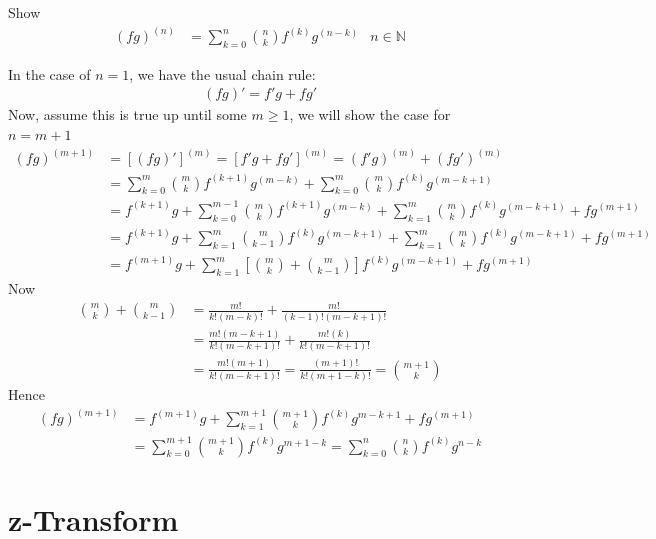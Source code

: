 \documentclass[12pt, english]{book}
\makeatletter
\renewenvironment{proof}[1][\proofname]{\par
	\pushQED{\qed}%
	\normalfont \topsep6\p@\@plus6\p@\relax
	\list{}{%
		\settowidth{\leftmargin}{\itshape\proofname:\hskip\labelsep}%
		\setlength{\labelwidth}{0pt}%
		\setlength{\itemindent}{-\leftmargin}%
		}%
	\item[\hskip\labelsep\itshape#1\@addpunct{:}]\ignorespaces
	}{\popQED\endlist\@endpefalse}
\makeatother
\begin{document}
	\begin{example}
		\label{Leibniz's Rule Proof - Complex}
		Show
		\begin{align*}
			(fg)^{(n)} &= \sum_{k=0}^{n}\binom{n}{k} f^{(k)} g^{(n-k)} & n \in \mathbb{N}
		\end{align*}
		\begin{proof}
			{\color{Grey}
			In the case of \(n=1\), we have the usual chain rule:
			\begin{align*}
				(fg)' = f'g + fg'
			\end{align*}
			Now, assume this is true up until some \(m \geq 1\), we will show the case for \(n=m+1\)
			\begin{align*}
				(fg)^{(m+1)} 
				&= [(fg)']^{(m)} = [f'g + fg']^{(m)} = (f'g)^{(m)} + (fg')^{(m)} \\
				&= \sum_{k=0}^{m} \binom{m}{k} f^{(k+1)} g^{(m-k)} + \sum_{k=0}^{m} \binom{m}{k} f^{(k)} g^{(m-k+1)} \\
				&= f^{(k+1)}g + \sum_{k=0}^{m-1} \binom{m}{k} f^{(k+1)} g^{(m-k)}
				 + \sum_{k=1}^{m} \binom{m}{k} f^{(k)} g^{(m-k+1)} + fg^{(m+1)} \\
				&= f^{(k+1)}g + \sum_{k=1}^{m} \binom{m}{k-1} f^{(k)} g^{(m-k+1)}
				 + \sum_{k=1}^{m} \binom{m}{k} f^{(k)} g^{(m-k+1)} + fg^{(m+1)} \\
				&= f^{(m+1)} g + \sum_{k=1}^{m} \left[ \binom{m}{k} + \binom{m}{k-1}\right] f^{(k)} g^{(m-k+1)} + fg^{(m+1)}
			\end{align*}
			Now
			\begin{align*}
				\binom{m}{k} + \binom{m}{k-1} 
				&= \frac{m!}{k!(m-k)!} + \frac{m!}{(k-1)!(m-k+1)!}\\
				&= \frac{m!(m-k+1)}{k!(m-k+1)!} + \frac{m!(k)}{k!(m-k+1)!}\\
				&= \frac{m!(m+1)}{k!(m-k+1)!} = \frac{(m+1)!}{k!(m+1-k)!} = \binom{m+1}{k}
			\end{align*}
			Hence
			\begin{align*}
				(fg)^{(m+1)} 
				&= f^{(m+1)}g + \sum_{k=1}^{m+1} \binom{m+1}{k} f^{(k)} g^{m-k+1} + fg^{(m+1)} \\
				&= \sum_{k=0}^{m+1} \binom{m+1}{k} f^{(k)} g^{m+1-k} 
				 = \sum_{k=0}^{n} \binom{n}{k} f^{(k)} g^{n-k} 
			\end{align*}
			}
		\end{proof}
	\end{example}

	\section{z-Transform} \label{z-Transform Section - Complex}
\end{document}
